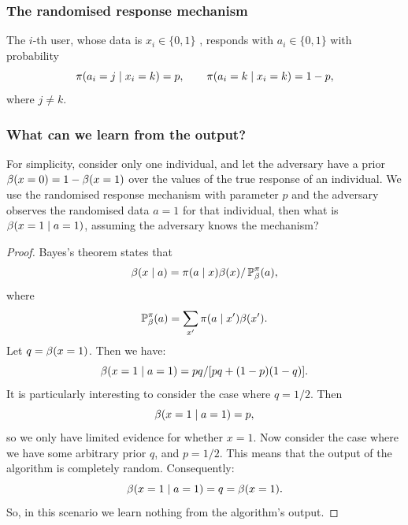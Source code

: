 \begin{frame}
  \frametitle{The randomised response mechanism}
  \begin{definition}
    The $i$-th user, whose data is $x_i \in \{0,1\}$ , responds with $a_i \in \{0, 1\}$ with probability
    \[
      \pi(a_i = j \mid x_i = k) = p,  \qquad  \pi(a_i = k \mid x_i = k) = 1 - p,
    \]
    where $j \neq k$.
  \end{definition}


\end{frame}

\begin{frame}
  \frametitle{What can we learn from the output?}

  \begin{example}
    For simplicity, consider only one individual, and let the
    adversary have a prior $\beta(x = 0) = 1 - \beta(x = 1)$ over the
    values of the true response of an individual. We use the
    randomised response mechanism with parameter $p$ and the
    adversary observes the randomised data $a = 1$ for that
    individual, then what is $\beta(x = 1 \mid a = 1)$, assuming the
    adversary knows the mechanism?
  \end{example}
  \begin{proof}
    Bayes's theorem states that
    \[
      \beta(x \mid a) = \pi(a \mid x) \beta(x) / \mathop{\mbox{\ensuremath{\mathbb{P}}}}\nolimits^\pi_\beta(a),
    \]
    where
    \[
      \mathop{\mbox{\ensuremath{\mathbb{P}}}}\nolimits^\pi_\beta(a) = \sum_{x'} \pi(a \mid x') \beta(x').
    \]
    Let $q = \beta(x = 1)$. Then we have:
    \[
      \beta(x = 1 \mid a = 1) = pq / [pq + (1-p)(1 - q)].
    \]
    It is particularly interesting to consider the case where $q = 1/2$. Then
    \[
      \beta(x = 1 \mid a = 1) = p,
    \]
    so we only have limited evidence for whether $x=1$. Now consider the case where we have some arbitrary prior $q$, and $p=1/2$. This means that the output of the algorithm is completely random. Consequently:
    \[
      \beta(x = 1 \mid a = 1) = q = \beta(x=1).
    \]
    So, in this scenario we learn nothing from the algorithm's output.
  \end{proof}
\end{frame}


